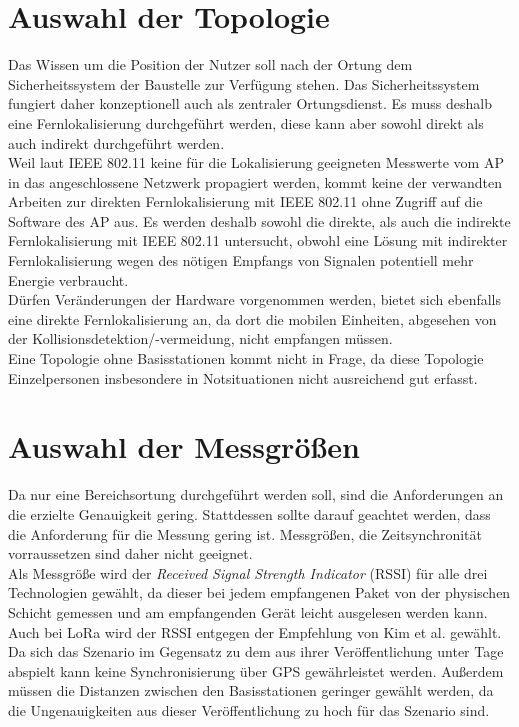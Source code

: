 \section{Auswahl der Topologie}
Das Wissen um die Position der Nutzer soll nach der Ortung dem Sicherheitssystem der Baustelle zur Verfügung stehen. 
Das Sicherheitssystem fungiert daher konzeptionell auch als zentraler Ortungsdienst.
Es muss deshalb eine Fernlokalisierung durchgeführt werden, diese kann aber sowohl direkt als auch indirekt durchgeführt werden. \\
Weil laut IEEE 802.11 keine für die Lokalisierung geeigneten Messwerte vom AP in das angeschlossene Netzwerk propagiert werden, kommt keine der verwandten Arbeiten zur direkten Fernlokalisierung mit IEEE 802.11 ohne Zugriff auf die Software des AP aus.
Es werden deshalb sowohl die direkte, als auch die indirekte Fernlokalisierung mit IEEE 802.11 untersucht, obwohl eine Lösung mit indirekter Fernlokalisierung wegen des nötigen Empfangs von Signalen potentiell mehr Energie verbraucht.\\
Dürfen Veränderungen der Hardware vorgenommen werden, bietet sich ebenfalls eine direkte Fernlokalisierung an, da dort die mobilen Einheiten, abgesehen von der Kollisionsdetektion/-vermeidung, nicht empfangen müssen.\\
Eine Topologie ohne Basisstationen kommt nicht in Frage, da diese Topologie Einzelpersonen insbesondere in Notsituationen nicht ausreichend gut erfasst.




\section{Auswahl der Messgrößen}
Da nur eine Bereichsortung durchgeführt werden soll, sind die Anforderungen an die erzielte Genauigkeit gering.
Stattdessen sollte darauf geachtet werden, dass die Anforderung für die Messung gering ist.
Messgrößen, die Zeitsynchronität vorraussetzen sind daher nicht geeignet.\\
Als Messgröße wird der \emph{Received Signal Strength Indicator} (RSSI) für alle drei Technologien gewählt, da dieser bei jedem empfangenen Paket von der physischen Schicht gemessen und am empfangenden Gerät leicht ausgelesen werden kann.\\
Auch bei LoRa wird der RSSI entgegen der Empfehlung von Kim et al. gewählt.
Da sich das Szenario im Gegensatz zu dem aus ihrer  Veröffentlichung unter Tage abspielt kann keine Synchronisierung über GPS gewährleistet werden. 
Außerdem müssen die Distanzen zwischen den Basisstationen geringer gewählt werden, da die Ungenauigkeiten aus dieser Veröffentlichung zu hoch für das Szenario sind.

